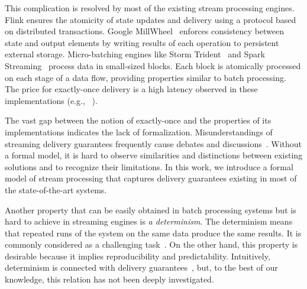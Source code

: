 This complication is resolved by most of the existing stream processing engines. 
Flink ensures the atomicity of state updates and delivery using a protocol based on distributed transactions. 
Google MillWheel~\cite{Akidau:2013:MFS:2536222.2536229} enforces consistency between state and output elements by writing results of each operation to persistent external storage. 
Micro-batching engines like Storm Trident~\cite{apache:storm:trident} and Spark Streaming~\cite{Zaharia:2012:DSE:2342763.2342773} process data in small-sized blocks. 
Each block is atomically processed on each stage of a data flow, providing properties similar to batch processing. 
The price for exactly-once delivery is a high latency observed in these implementations (e.g., ~\cite{7530084, 7474816}).


The vast gap between the notion of exactly-once and the properties of its implementations indicates the lack of formalization. 
Misunderstandings of streaming delivery guarantees frequently cause debates and discussions~\cite{JerryPengStreamIO, PaperTrail}. Without a formal model, it is hard to observe similarities and distinctions between existing solutions and to recognize their limitations. In this work, we introduce a formal model of stream processing that captures delivery guarantees existing in most of the state-of-the-art systems.

Another property that can be easily obtained in batch processing systems but is hard to achieve in streaming engines is {\em a determinism}. 
The determinism means that repeated runs of the system on the same data produce the same results. It is commonly considered as a challenging task~\cite{Zacheilas:2017:MDS:3093742.3093921}. On the other hand, this property is desirable because it implies reproducibility and predictability. Intuitively, determinism is connected with delivery guarantees~\cite{Stonebraker:2005:RRS:1107499.1107504}, but, to the best of our knowledge, this relation has not been deeply investigated. 


